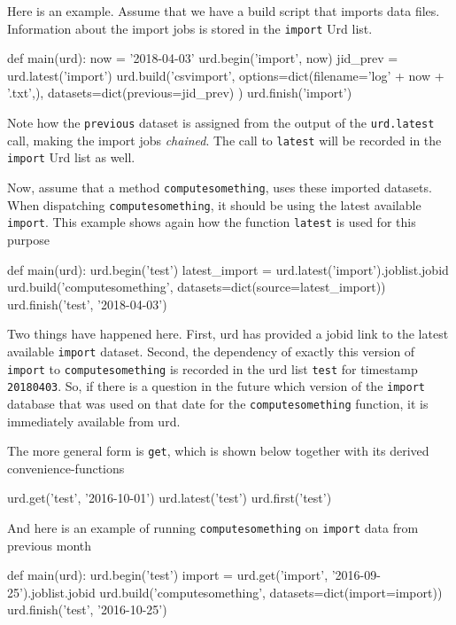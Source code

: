 Here is an example.  Assume that we have a build script that imports
data files.  Information about the import jobs is stored in the
\texttt{import} Urd list.
\begin{python}
def main(urd):
    now = '2018-04-03'
    urd.begin('import', now)
    jid_prev = urd.latest('import')
    urd.build('csvimport',
        options=dict(filename='log' + now + '.txt',),
        datasets=dict(previous=jid_prev)
    )
    urd.finish('import')
\end{python}
Note how the \texttt{previous} dataset is assigned from the output of
the \texttt{urd.latest} call, making the import jobs \textsl{chained}.
The call to \texttt{latest} will be recorded in the \texttt{import}
Urd list as well.

Now, assume that a method \texttt{computesomething}, uses these
imported datasets.  When dispatching \texttt{computesomething}, it
should be using the latest available \texttt{import}.  This example
shows again how the function \texttt{latest} is used for this purpose
\begin{python}
def main(urd):
    urd.begin('test')
    latest_import = urd.latest('import').joblist.jobid
    urd.build('computesomething', datasets=dict(source=latest_import))
    urd.finish('test', '2018-04-03')
\end{python}
Two things have happened here.  First, urd has provided a jobid link
to the latest available \texttt{import} dataset.  Second, the
dependency of exactly this version of \texttt{import} to
\texttt{computesomething} is recorded in the urd list \texttt{test}
for timestamp \texttt{20180403}.  So, if there is a question in the
future which version of the \texttt{import} database that was used on
that date for the \texttt{computesomething} function, it is
immediately available from urd.

The more general form is \texttt{get}, which is shown below together
with its derived convenience-functions
\begin{python}
    urd.get('test', '2016-10-01')
    urd.latest('test')
    urd.first('test')
\end{python}
And here is an example of running \texttt{computesomething} on \texttt{import} data
from previous month
\begin{python}
def main(urd):
    urd.begin('test')
    import = urd.get('import', '2016-09-25').joblist.jobid
    urd.build('computesomething', datasets=dict(import=import))
    urd.finish('test', '2016-10-25')
\end{python}



